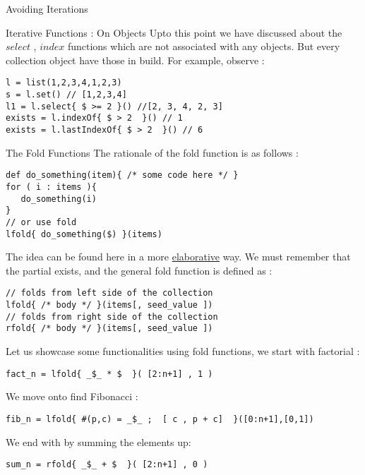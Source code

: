 \begin{section}{Avoiding Iterations}
\begin{subsection}{Iterative Functions : On Objects}
Upto this point we have discussed about the $select$ , $index$ functions
which are not associated with any objects. But every collection object 
have those in build. For example, observe :
\begin{lstlisting}[style=JexlStyle]
l = list(1,2,3,4,1,2,3)
s = l.set() // [1,2,3,4]
l1 = l.select{ $ >= 2 }() //[2, 3, 4, 2, 3] 
exists = l.indexOf{ $ > 2  }() // 1
exists = l.lastIndexOf{ $ > 2  }() // 6
\end{lstlisting}
\end{subsection}

\begin{subsection}{The Fold Functions}
The rationale of the fold function is as follows :

\begin{lstlisting}[style=JexlStyle]
def do_something(item){ /* some code here */ }
for ( i : items ){
   do_something(i)
}
// or use fold
lfold{ do_something($) }(items)
\end{lstlisting}
The idea can be found here in a more \href{https://en.wikipedia.org/wiki/Fold_(higher-order_function)}{elaborative} way.
We must remember that the partial exists, and the general fold function is defined as :

\begin{lstlisting}[style=JexlStyle]
// folds from left side of the collection 
lfold{ /* body */ }(items[, seed_value ])
// folds from right side of the collection 
rfold{ /* body */ }(items[, seed_value ])
\end{lstlisting}

Let us showcase some functionalities using fold functions,
we start with factorial : 

\begin{lstlisting}[style=JexlStyle]
fact_n = lfold{ _$_ * $  }( [2:n+1] , 1 )
\end{lstlisting}

We move onto find Fibonacci : 

\begin{lstlisting}[style=JexlStyle]
fib_n = lfold{ #(p,c) = _$_ ;  [ c , p + c]  }([0:n+1],[0,1])
\end{lstlisting}

We end with by summing the elements up:

\begin{lstlisting}[style=JexlStyle]
sum_n = rfold{ _$_ + $  }( [2:n+1] , 0 )
\end{lstlisting}


\end{subsection}

\end{section}
